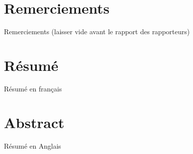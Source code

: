 \documentclass[a4paper,11pt]{book}
\begin{document}
    \thesisTitle
    
	\section*{Remerciements}
        Remerciements (laisser vide avant le rapport des rapporteurs)
	\newpage
	\section*{Résumé}

	   Résumé en français

	\section*{Abstract}

	   Résumé en Anglais

	\tableofcontents


	
    
\end{document}
